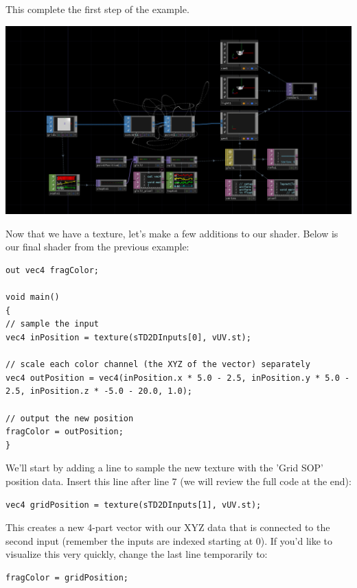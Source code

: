 \begin{fullwidth}
This complete the first step of the example.

\begin{center}
\includegraphics{./img/12.6.3/step1.png}
\end{center}

Now that we have a texture, let's make a few additions to our shader. Below is our final shader from the previous example:

\begin{lstlisting}
out vec4 fragColor;

void main()
{
// sample the input
vec4 inPosition = texture(sTD2DInputs[0], vUV.st);

// scale each color channel (the XYZ of the vector) separately
vec4 outPosition = vec4(inPosition.x * 5.0 - 2.5, inPosition.y * 5.0 - 2.5, inPosition.z * -5.0 - 20.0, 1.0);

// output the new position
fragColor = outPosition;
}
\end{lstlisting}

We'll start by adding a line to sample the new texture with the 'Grid SOP' position data. Insert this line after line 7 (we will review the full code at the end):

\begin{lstlisting}
vec4 gridPosition = texture(sTD2DInputs[1], vUV.st);
\end{lstlisting}

This creates a new 4-part vector with our XYZ data that is connected to the second input (remember the inputs are indexed starting at 0). If you'd like to visualize this very quickly, change the last line temporarily to:

\begin{lstlisting}
fragColor = gridPosition;
\end{lstlisting}


\end{fullwidth}
